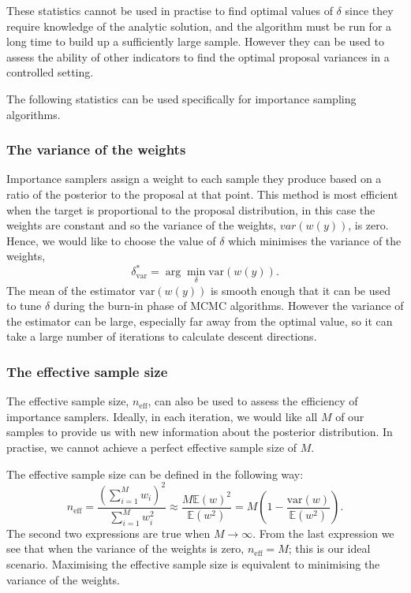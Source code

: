 \documentclass[final]{siamltex}
\newcommand{\neff}{n_{\text{eff}}}
\newcommand{\E}{{\mathbb E}}
\begin{document}
These statistics cannot be used in practise to find optimal values of
$\delta$ since they require knowledge of the analytic solution, and
the algorithm must be run for a long time to build up a
sufficiently large sample. However they can be used to assess the
ability of other indicators to find the optimal proposal
variances in a controlled setting.

The following statistics can be used specifically for importance sampling algorithms.

\subsubsection{The variance of the weights}

Importance samplers assign a weight to each sample they produce based on a ratio of the posterior to the proposal at that point. This method is most efficient when the target is proportional to the proposal distribution, in this case the weights are constant and so the variance of the weights, $var(w(y))$, is zero. Hence, we would like to choose the value of $\delta$ which minimises the variance of the weights,
\[
	\delta^*_{\text{var}} = \arg\min_{\delta} \text{var}(w(y)).
\]
The mean of the estimator $\text{var}(w(y))$ is smooth enough that it can be used to tune $\delta$ during the burn-in phase of MCMC algorithms. However the variance of the estimator can be large, especially far away from the optimal value, so it can take a large number of iterations to calculate descent directions.

\subsubsection{The effective sample size}\label{sec:ess}

The effective sample size, $\neff$, can also be used to assess the efficiency of importance samplers. Ideally, in each iteration, we would like all $M$ of our samples to provide us with new information about the posterior distribution. In practise, we cannot achieve a perfect effective sample size of $M$.

The effective sample size can be defined in the following way:
\[
	\neff = \frac{\left(\sum_{i=1}^M \! w_i\right)^2}{\sum_{i=1}^M \! w_i^2} \approx \frac{M\E(w)^2}{\E(w^2)} = M\left(1 - \frac{\mbox{var}(w)}{\mathbb{E}(w^2)}\right).
\]
The second two expressions are true when $M\rightarrow\infty$. From
the last expression we see that when the variance of the weights is
zero, $\neff = M$; this is our ideal scenario. Maximising the effective sample size is equivalent to minimising the variance of the weights.
\end{document}
